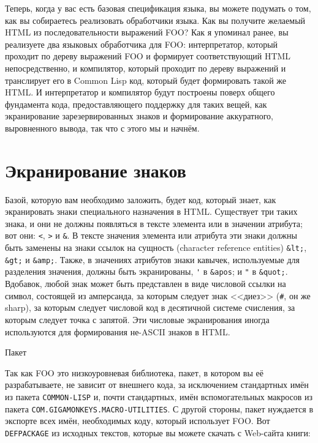 Теперь, когда у вас есть базовая спецификация языка, вы можете подумать о том, как вы
собираетесь реализовать обработчики языка. Как вы получите желаемый HTML из
последовательности выражений FOO? Как я упоминал ранее, вы реализуете два языковых
обработчика для FOO: интерпретатор, который проходит по дереву выражений FOO и формирует
соответствующий HTML непосредственно, и компилятор, который проходит по дереву выражений и
транслирует его в Common Lisp код, который будет формировать такой же HTML. И
интерпретатор и компилятор будут построены поверх общего фундамента кода, предоставляющего
поддержку для таких вещей, как экранирование зарезервированных знаков и формирование
аккуратного, выровненного вывода, так что с этого мы и начнём.

\section{Экранирование знаков}

Базой, которую вам необходимо заложить, будет код, который знает, как экранировать знаки
специального назначения в HTML. Существует три таких знака, и они не должны появляться в
тексте элемента или в значении атрибута; вот они: \lstinline{<}, \lstinline{>} и \lstinline!&!. В
тексте значения элемента или атрибута эти знаки должны быть заменены на знаки ссылок на
сущность (character reference entities) \lstinline!&lt;!, \lstinline!&gt;! и
\lstinline!&amp;!. Также, в значениях атрибутов знаки кавычек, используемые для разделения
значения, должны быть экранированы, \lstinline!'! в \lstinline!&apos!; и \lstinline!"! в
\lstinline!&quot;!. Вдобавок, любой знак может быть представлен в виде числовой ссылки на
символ, состоящей из амперсанда, за которым следует знак <<диез>> (\lstinline!#!, он же
sharp), за которым следует числовой код в десятичной системе счисления, за которым следует
точка с запятой. Эти числовые экранирования иногда используются для формирования не-ASCII
знаков в HTML.


Пакет 

Так как FOO это низкоуровневая библиотека, пакет, в котором вы её разрабатываете, не
зависит от внешнего кода, за исключением стандартных имён из пакета \lstinline{COMMON-LISP} и,
почти стандартных, имён вспомогательных макросов из пакета
\lstinline{COM.GIGAMONKEYS.MACRO-UTILITIES}. С другой стороны, пакет нуждается в экспорте всех
имён, необходимых коду, который использует FOO. Вот \lstinline{DEFPACKAGE} из исходных текстов,
которые вы можете скачать с Web-сайта книги:

